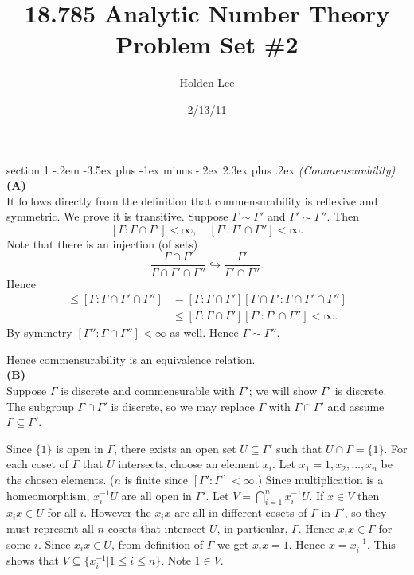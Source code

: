 \documentclass[12pt]{article}
\makeatletter
\theoremstyle{norm}
\newcommand{\subeq}[0]{\subseteq}
\newcommand{\Ga}[0]{\Gamma}
\newcommand{\hr}[0]{\hookrightarrow}
\newcommand{\subprob}[1]{\noindent\textbf{#1}\\}
\newenvironment{problem}{\@startsection
       {section}
       {1}
       {-.2em}
       {-3.5ex plus -1ex minus -.2ex}
       {2.3ex plus .2ex}
       {\pagebreak[3]%
       \large\bf\noindent{Problem }
       }
       }
       {%
       }
\makeatother
\begin{document}
\title{18.785 Analytic Number Theory Problem Set \#2}%
\author{Holden Lee}
\date{2/13/11}%
\maketitle
\thispagestyle{empty}

\begin{problem}{\it (Commensurability)}
\subprob{(A)}
It follows directly from the definition that commensurability is reflexive and symmetric. We prove it is transitive. Suppose $\Ga\sim \Ga'$ and $\Ga'\sim \Ga''$. Then
\[
[\Ga:\Ga\cap \Ga']<\infty,\quad [\Ga':\Ga'\cap \Ga'']<\infty.
\]
Note that there is an injection (of sets)
\[
\frac{\Ga\cap \Ga'}{\Ga\cap \Ga'\cap \Ga''}\hr \frac{\Ga'}{\Ga'\cap \Ga''}.
\]
Hence
\begin{align*}
[\Ga:\Ga\cap \Ga'']\leq [\Ga:\Ga\cap \Ga'\cap \Ga'']
&=[\Ga:\Ga\cap \Ga'][\Ga\cap \Ga':\Ga\cap \Ga'\cap\Ga'']\\
&\leq [\Ga:\Ga\cap \Ga'][\Ga':\Ga'\cap\Ga'']<\infty.
\end{align*}
By symmetry $[\Ga'':\Ga\cap \Ga'']<\infty$ as well. Hence $\Ga\sim \Ga''$.

Hence commensurability is an equivalence relation.\\

\subprob{(B)}
Suppose $\Ga$ is discrete and commensurable with $\Ga'$; we will show $\Ga'$ is discrete. The subgroup $\Ga\cap \Ga'$ is discrete, so we may replace $\Ga$ with $\Ga\cap \Ga'$ and assume $\Ga\subeq \Ga'$.


Since $\{1\}$ is open in $\Ga$, there exists an open set $U\subeq \Ga'$ such that $U\cap \Ga=\{1\}$.
For each coset of $\Ga$ that $U$ intersects, choose an element $x_i$.
Let $x_1=1,x_2,\ldots, x_n$ be the chosen elements. ($n$ is finite since $[\Ga':\Ga]<\infty$.)
Since multiplication is a homeomorphism, $x_i^{-1}U$ are all open in $\Ga'$. 
Let $V=\bigcap_{i=1}^n x_i^{-1}U$.
If $x\in V$ then $x_ix\in U$ for all $i$. However the $x_ix$ are all in different cosets of $\Ga$ in $\Ga'$, so they must represent all $n$ cosets that intersect $U$, in particular, $\Ga$. Hence $x_ix\in \Ga$ for some $i$. Since $x_ix\in U$, from definition of $\Ga$ we get $x_ix=1$.
Hence $x=x_i^{-1}$. This shows that $V\subeq \{x_i^{-1}|1\leq i\leq n\}$. Note  $1\in V$.


\end{problem}
\end{document}
